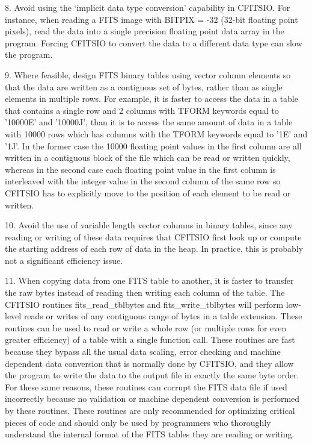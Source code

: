 \documentclass[11pt]{book}
\begin{document}
8. Avoid using the `implicit data type conversion' capability in
CFITSIO.  For instance, when reading a FITS image with BITPIX = -32
(32-bit floating point pixels), read the data into a single precision
floating point data array in the program.  Forcing CFITSIO to convert
the data to a different data type can slow the program.

9. Where feasible, design FITS binary tables using vector column
elements so that the data are written as a contiguous set of bytes,
rather than as single elements in multiple rows.  For example, it is
faster to access the data in a table that contains a single row
and 2 columns with TFORM keywords equal to  '10000E' and '10000J', than
it is to access the same amount of data in a table with 10000 rows
which has columns with the TFORM keywords equal to '1E' and '1J'.  In
the former case the 10000 floating point values in the first column are
all written in a contiguous block of the file which can be read or
written quickly, whereas in the second case each floating point value
in the first column is interleaved with the integer value in the second
column of the same row so CFITSIO has to explicitly move to the
position of each element to be read or written.

10. Avoid the use of variable length vector columns in binary tables,
since any reading or writing of these data requires that CFITSIO first
look up or compute the starting address of each row of data in the
heap.  In practice, this is probably not a significant efficiency issue.

11. When copying data from one FITS table to another, it is faster to
transfer the raw bytes instead of reading then writing each column of
the table.  The CFITSIO routines fits\_read\_tblbytes and
fits\_write\_tblbytes will perform low-level reads or writes of any
contiguous range of bytes in a table extension.  These routines can be
used to read or write a whole row (or multiple rows  for even greater
efficiency) of a table with a single function call.   These routines
are fast because they bypass all the usual data scaling, error checking
and machine dependent data conversion that is normally done by CFITSIO,
and they allow the program to write the data to the output file in
exactly the same byte order.  For these same reasons, these routines
can corrupt the FITS data file if used incorrectly because no
validation or machine dependent conversion is performed by these
routines.  These routines are only recommended for optimizing critical
pieces of code and should only be used by programmers who thoroughly
understand the internal format of the FITS tables they are reading or
writing.
\end{document}
